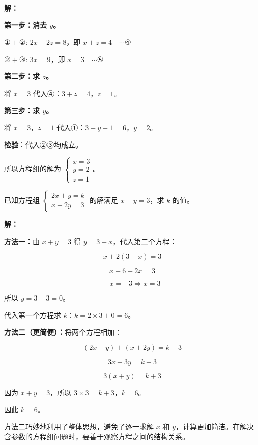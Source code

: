 \documentclass[12pt, a4paper]{ctexart}
\begin{document}
\textbf{解：}

\textbf{第一步：消去 $y$。}

$① + ②$: $2x + 2z = 8$，即 $x + z = 4 \quad \cdots ④$

$② + ③$: $3x = 9$，即 $x = 3 \quad \cdots ⑤$

\textbf{第二步：求 $z$。}

将 $x = 3$ 代入④：$3 + z = 4$，$z = 1$。

\textbf{第三步：求 $y$。}

将 $x = 3$，$z = 1$ 代入①：$3 + y + 1 = 6$，$y = 2$。

\textbf{检验}：代入②③均成立。

所以方程组的解为 $\boxed{\begin{cases} x = 3 \\ y = 2 \\ z = 1 \end{cases}}$。

\bigskip

\begin{examplebox}[【例题6】含参数的方程组]
已知方程组 $\begin{cases} 2x + y = k \\ x + 2y = 3 \end{cases}$ 的解满足 $x + y = 3$，求 $k$ 的值。
\end{examplebox}

\textbf{解：}

\textbf{方法一：}由 $x + y = 3$ 得 $y = 3 - x$，代入第二个方程：

$$x + 2(3 - x) = 3$$

$$x + 6 - 2x = 3$$

$$-x = -3 \Rightarrow x = 3$$

所以 $y = 3 - 3 = 0$。

代入第一个方程求 $k$：$k = 2 \times 3 + 0 = 6$。

\textbf{方法二（更简便）：}将两个方程相加：

$$(2x + y) + (x + 2y) = k + 3$$

$$3x + 3y = k + 3$$

$$3(x + y) = k + 3$$

因为 $x + y = 3$，所以 $3 \times 3 = k + 3$，$k = 6$。

因此 $\boxed{k = 6}$。

\begin{tipbox}[方法总结]
方法二巧妙地利用了整体思想，避免了逐一求解 $x$ 和 $y$，计算更加简洁。在解决含参数的方程组问题时，要善于观察方程之间的结构关系。
\end{tipbox}
\end{document}
